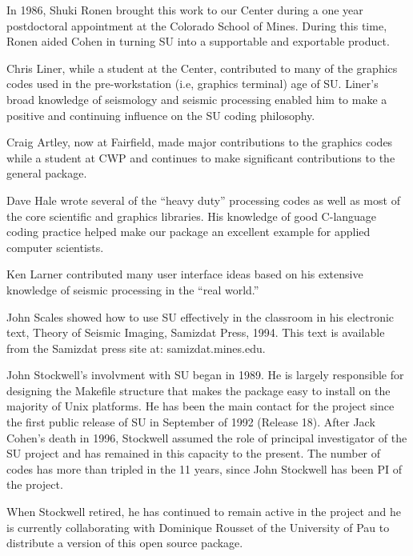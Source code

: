 In 1986, Shuki Ronen brought this work to our Center during a
one year postdoctoral appointment at the Colorado School of Mines. 
During this time, Ronen aided Cohen in turning SU into a 
supportable and exportable product.

Chris Liner, while a student at the Center, contributed to many of the graphics
codes used in the pre-workstation (i.e, graphics terminal) age of  SU.
Liner's broad knowledge of seismology and seismic processing enabled
him to make a positive and continuing influence on the SU coding
philosophy.

Craig Artley, now at Fairfield, made major contributions to
the graphics codes while a student at CWP and continues to make
significant contributions to the general package.

Dave Hale wrote several of the ``heavy duty'' processing codes as well
as most of the core scientific and graphics libraries.  His knowledge
of good C-language coding practice helped make our package an excellent
example for applied computer scientists.

Ken Larner contributed many user interface ideas based on his
extensive knowledge of seismic processing in the ``real world.''

John Scales showed how to use  SU effectively in the classroom in his
electronic text, Theory of Seismic Imaging, Samizdat Press, 1994.
This text is available from the Samizdat press site at:  samizdat.mines.edu.

John Stockwell's involvment with SU began in 1989. He is largely 
responsible for designing the Makefile structure that makes the 
package easy to install on the majority of Unix platforms.  He has 
been the main contact for the project since the first public release 
of SU in September of 1992 (Release 18).  After
Jack Cohen's death in 1996, Stockwell assumed the role of principal
investigator of the SU project and has remained in this capacity to
the present.   The number of codes has more than tripled in the 11
years, since John Stockwell has been PI of the project. 

When Stockwell retired, he has continued to remain active in the project
and he is currently collaborating with Dominique Rousset of the University
of Pau to distribute a version of this open source package.

